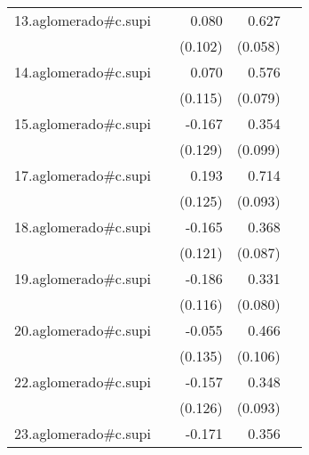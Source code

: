 {\begin{longtable}{l*{4}{D{.}{.}{-1}}}
\addlinespace
13.aglomerado#c.supi&                     &       0.080         &       0.627\sym{***}&                     \\
            &                     &     (0.102)         &     (0.058)         &                     \\
\addlinespace
14.aglomerado#c.supi&                     &       0.070         &       0.576\sym{***}&                     \\
            &                     &     (0.115)         &     (0.079)         &                     \\
\addlinespace
15.aglomerado#c.supi&                     &      -0.167         &       0.354\sym{***}&                     \\
            &                     &     (0.129)         &     (0.099)         &                     \\
\addlinespace
17.aglomerado#c.supi&                     &       0.193         &       0.714\sym{***}&                     \\
            &                     &     (0.125)         &     (0.093)         &                     \\
\addlinespace
18.aglomerado#c.supi&                     &      -0.165         &       0.368\sym{***}&                     \\
            &                     &     (0.121)         &     (0.087)         &                     \\
\addlinespace
19.aglomerado#c.supi&                     &      -0.186         &       0.331\sym{***}&                     \\
            &                     &     (0.116)         &     (0.080)         &                     \\
\addlinespace
20.aglomerado#c.supi&                     &      -0.055         &       0.466\sym{***}&                     \\
            &                     &     (0.135)         &     (0.106)         &                     \\
\addlinespace
22.aglomerado#c.supi&                     &      -0.157         &       0.348\sym{***}&                     \\
            &                     &     (0.126)         &     (0.093)         &                     \\
\addlinespace
23.aglomerado#c.supi&                     &      -0.171         &       0.356\sym{***}&                     \\

\end{longtable}}
